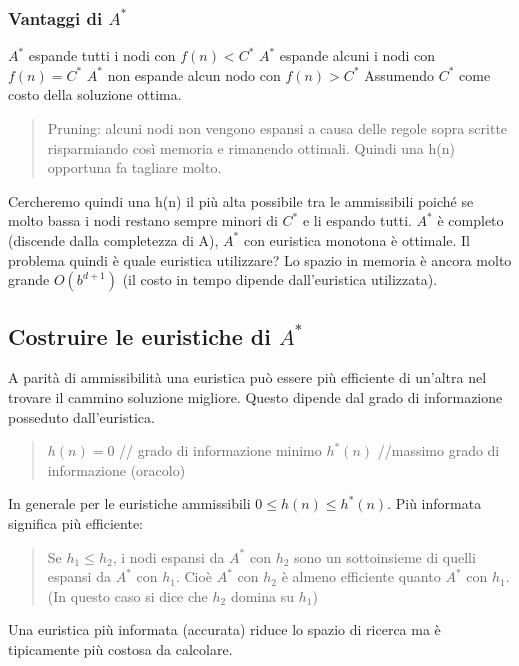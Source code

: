 \documentclass{article}
\begin{document}
\subsubsection{Vantaggi di $A^*$}
$A^*$ espande tutti i nodi con $f(n) < C^*$ \newline
$A^*$ espande alcuni i nodi con $f(n) = C^*$ \newline
$A^*$ non espande alcun nodo con $f(n) > C^*$ \newline
Assumendo $C^*$ come costo della soluzione ottima.
\begin{quote}
    Pruning: alcuni nodi non vengono espansi a causa delle regole sopra scritte risparmiando così memoria e rimanendo ottimali. Quindi una h(n) opportuna fa tagliare molto.
\end{quote}
Cercheremo quindi una h(n) il più alta possibile tra le ammissibili poiché se molto bassa i nodi restano sempre minori di $C^*$ e li espando tutti. \newline
$A^*$ è completo (discende dalla completezza di A), $A^*$ con euristica monotona è ottimale. Il problema quindi è quale euristica utilizzare? Lo spazio in memoria è ancora molto grande $O(b^{d+1})$ (il costo in tempo dipende dall'euristica utilizzata). 

\subsection{Costruire le euristiche di $A^*$}
A parità di ammissibilità una euristica può essere più efficiente di un'altra nel trovare il cammino soluzione migliore. Questo dipende dal grado di informazione posseduto dall'euristica.
\begin{quote}
    $h(n) = 0$ // grado di informazione minimo \newline
    $h^*(n)$ //massimo grado di informazione (oracolo)
\end{quote}
In generale per le euristiche ammissibili $0 \leq h(n) \leq h^*(n)$. \newline
Più informata significa più efficiente:
\begin{quote}
    Se $h_1 \leq h_2$, i nodi espansi da $A^*$ con $h_2$ sono un sottoinsieme di quelli espansi da $A^*$ con $h_1$. Cioè $A^*$ con $h_2$ è almeno efficiente quanto $A^*$ con $h_1$. (In questo caso si dice che $h_2$ domina su $h_1$)
\end{quote}
Una euristica più informata (accurata) riduce lo spazio di ricerca ma è tipicamente più costosa da calcolare. 
\end{document}
